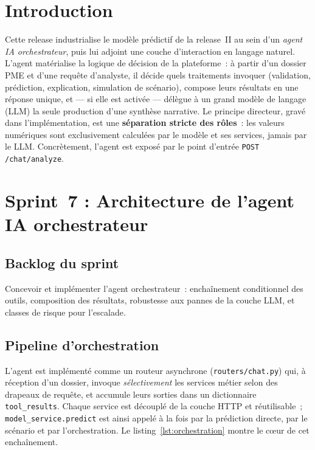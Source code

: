 \documentclass[a4paper,12pt,oneside]{report}
\begin{document}
\section*{Introduction}

Cette release industrialise le modèle prédictif de la release~II au sein d'un \emph{agent IA
orchestrateur}, puis lui adjoint une couche d'interaction en langage naturel. L'agent
matérialise la logique de décision de la plateforme~: à partir d'un dossier PME et d'une
requête d'analyste, il décide quels traitements invoquer (validation, prédiction, explication,
simulation de scénario), compose leurs résultats en une réponse unique, et — si elle est
activée — délègue à un grand modèle de langage (LLM) la seule production d'une synthèse
narrative. Le principe directeur, gravé dans l'implémentation, est une \textbf{séparation
stricte des rôles}~: les valeurs numériques sont exclusivement calculées par le modèle et ses
services, jamais par le LLM. Concrètement, l'agent est exposé par le point d'entrée
\texttt{POST /chat/analyze}.

\section{Sprint~7 : Architecture de l'agent IA orchestrateur}

\subsection{Backlog du sprint}

Concevoir et implémenter l'agent orchestrateur~: enchaînement conditionnel des outils,
composition des résultats, robustesse aux pannes de la couche LLM, et classes de risque pour
l'escalade.

\subsection{Pipeline d'orchestration}

L'agent est implémenté comme un routeur asynchrone (\texttt{routers/chat.py}) qui, à réception
d'un dossier, invoque \emph{sélectivement} les services métier selon des drapeaux de requête,
et accumule leurs sorties dans un dictionnaire \texttt{tool\_results}. Chaque service est
découplé de la couche HTTP et réutilisable~; \texttt{model\_service.predict} est ainsi appelé
à la fois par la prédiction directe, par le scénario et par l'orchestration. Le
listing~\ref{lst:orchestration} montre le c\oe ur de cet enchaînement.
\end{document}
